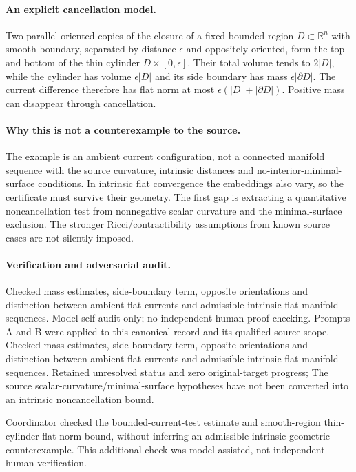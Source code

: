 \documentclass[11pt]{article}
\begin{document}
\paragraph{An explicit cancellation model.} Two parallel oriented copies of the closure of a fixed bounded region $D\subset\mathbb R^n$ with smooth boundary, separated by distance $\epsilon$ and oppositely oriented, form the top and bottom of the thin cylinder $D\times[0,\epsilon]$. Their total volume tends to $2|D|$, while the cylinder has volume $\epsilon|D|$ and its side boundary has mass $\epsilon|\partial D|$. The current difference therefore has flat norm at most $\epsilon(|D|+|\partial D|)$. Positive mass can disappear through cancellation.

\paragraph{Why this is not a counterexample to the source.} The example is an ambient current configuration, not a connected manifold sequence with the source curvature, intrinsic distances and no-interior-minimal-surface conditions. In intrinsic flat convergence the embeddings also vary, so the certificate must survive their geometry. The first gap is extracting a quantitative noncancellation test from nonnegative scalar curvature and the minimal-surface exclusion. The stronger Ricci/contractibility assumptions from known source cases are not silently imposed.

\paragraph{Verification and adversarial audit.}
Checked mass estimates, side-boundary term, opposite orientations and distinction between ambient flat currents and admissible intrinsic-flat manifold sequences. Model self-audit only; no independent human proof checking. Prompts A and B were applied to this canonical record and its qualified source scope. Checked mass estimates, side-boundary term, opposite orientations and distinction between ambient flat currents and admissible intrinsic-flat manifold sequences. Retained unresolved status and zero original-target progress; The source scalar-curvature/minimal-surface hypotheses have not been converted into an intrinsic noncancellation bound.

Coordinator checked the bounded-current-test estimate and smooth-region thin-cylinder flat-norm bound, without inferring an admissible intrinsic geometric counterexample. This additional check was model-assisted, not independent human verification.
\end{document}
